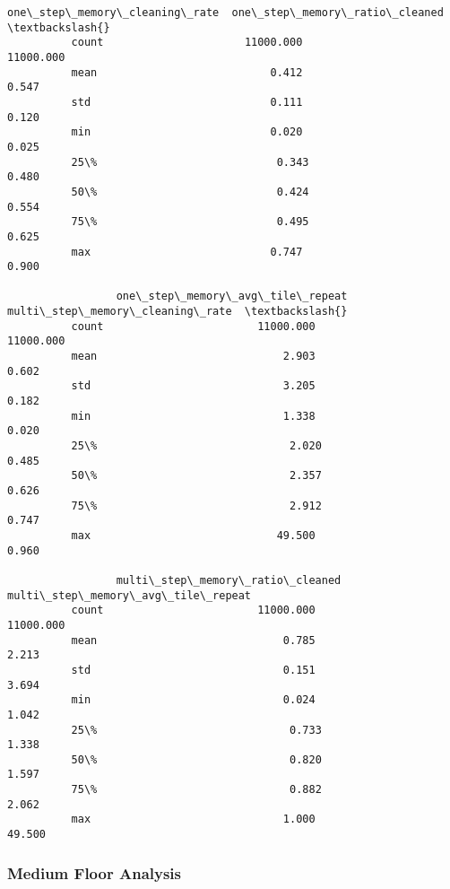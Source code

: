 \documentclass[11pt]{article}
\begin{document}
\begin{Verbatim}[commandchars=\\\{\}]
                 one\_step\_memory\_cleaning\_rate  one\_step\_memory\_ratio\_cleaned  \textbackslash{}
          count                      11000.000                      11000.000   
          mean                           0.412                          0.547   
          std                            0.111                          0.120   
          min                            0.020                          0.025   
          25\%                            0.343                          0.480   
          50\%                            0.424                          0.554   
          75\%                            0.495                          0.625   
          max                            0.747                          0.900   
          
                 one\_step\_memory\_avg\_tile\_repeat  multi\_step\_memory\_cleaning\_rate  \textbackslash{}
          count                        11000.000                        11000.000   
          mean                             2.903                            0.602   
          std                              3.205                            0.182   
          min                              1.338                            0.020   
          25\%                              2.020                            0.485   
          50\%                              2.357                            0.626   
          75\%                              2.912                            0.747   
          max                             49.500                            0.960   
          
                 multi\_step\_memory\_ratio\_cleaned  multi\_step\_memory\_avg\_tile\_repeat  
          count                        11000.000                          11000.000  
          mean                             0.785                              2.213  
          std                              0.151                              3.694  
          min                              0.024                              1.042  
          25\%                              0.733                              1.338  
          50\%                              0.820                              1.597  
          75\%                              0.882                              2.062  
          max                              1.000                             49.500  
\end{Verbatim}
            
     \subsubsection{ Medium Floor Analysis}
\end{document}
